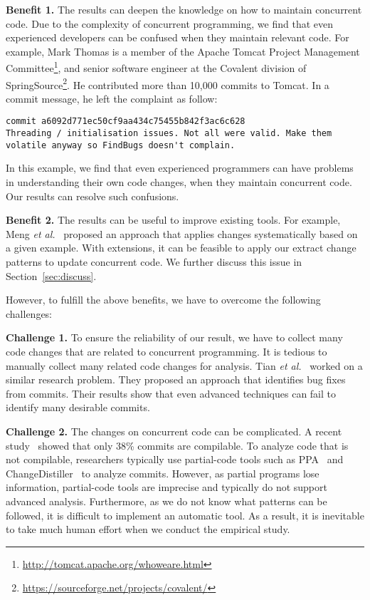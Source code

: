 \noindent
\textbf{Benefit 1.} The results can deepen the knowledge on how to maintain concurrent code. Due to the complexity of concurrent programming, we find that even experienced developers can be confused when they maintain relevant code. For example, Mark Thomas is a member of the Apache Tomcat Project Management Committee\footnote{\url{http://tomcat.apache.org/whoweare.html}}, and senior software engineer at the Covalent division of SpringSource\footnote{\url{https://sourceforge.net/projects/covalent/}}. He contributed more than 10,000 commits to Tomcat. In a commit message, he left the complaint as follow:


\begin{lstlisting}
commit a6092d771ec50cf9aa434c75455b842f3ac6c628
Threading / initialisation issues. Not all were valid. Make them volatile anyway so FindBugs doesn't complain.
\end{lstlisting}

\noindent
In this example, we find that even experienced programmers can have problems in understanding their own code changes, when they maintain concurrent code. Our results can resolve such confusions.


\noindent
\textbf{Benefit 2.} The results can be useful to improve existing tools. For example, Meng \emph{et al.}~\cite{conf/pldi/MengKM11} proposed an approach that applies changes systematically based on a given example. With extensions, it can be feasible to apply our extract change patterns to update concurrent code. We further discuss this issue in Section~\ref{sec:discuss}.

However, to fulfill the above benefits, we have to overcome the following challenges:

\noindent
\textbf{Challenge 1.} To ensure the reliability of our result, we have to collect many code changes that are related to concurrent programming. It is tedious to manually collect many related code changes for analysis. Tian \emph{et al.}~\cite{tian2012identifying} worked on a similar research problem. They proposed an approach that identifies bug fixes from commits. Their results show that even advanced techniques can fail to identify many desirable commits.


\noindent
\textbf{Challenge 2.} The changes on concurrent code can be complicated. A recent study~\cite{tufano2016there} showed that only 38\% commits are compilable. To analyze code that is not compilable, researchers typically use partial-code tools such as PPA~\cite{DagenaisH08ppa} and ChangeDistiller~\cite{fluri2007change} to analyze commits. However, as partial programs lose information, partial-code tools are imprecise and typically do not support advanced analysis. Furthermore, as we do not know what patterns can be followed, it is difficult to implement an automatic tool. As a result, it is inevitable to take much human effort when we conduct the empirical study.

